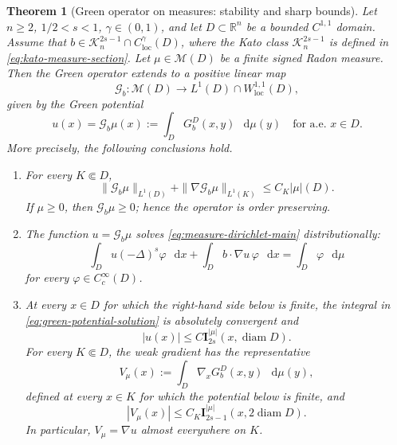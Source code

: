 \documentclass[10pt,a4paper]{amsart}
\numberwithin{equation}{section}
\newtheorem{theorem}{Theorem}[section]
\newcommand{\R}{\mathbb R}
\newcommand{\M}{\mathcal M}
\newcommand{\I}{\mathbf I}
\newcommand{\differential}{\mathop{}\!\mathrm d}
\newcommand{\rev}[1]{#1}
\begin{document}
\begin{theorem}[\rev{Green operator on measures: stability and sharp bounds}]
\label{thm:measure-potential}
Let $n\ge2$, $1/2<s<1$, $\gamma\in(0,1)$, and let
$D\subset\R^n$ be a bounded $C^{1,1}$ domain.  Assume that
$b\in\mathcal K_n^{2s-1}\cap C^\gamma_{\mathrm{loc}}(D)$, where the Kato
class $\mathcal K_n^{2s-1}$ is defined in
\eqref{eq:kato-measure-section}.  Let
$\mu\in\M(D)$ be a finite signed Radon measure.
\begingroup
\rev{Then the Green
operator extends to a positive linear map}
\[
 \mathcal G_b:\M(D)\longrightarrow
 L^1(D)\cap W^{1,1}_{\mathrm{loc}}(D),
\]
\rev{given by the Green potential}
\begin{equation}\label{eq:green-potential-solution}
 u(x)=\mathcal G_b\mu(x):=\int_DG_b^D(x,y)\,\differential\mu(y)
 \quad\text{for a.e. }x\in D.
\end{equation}
\rev{More precisely, the following conclusions hold.}
\begin{enumerate}
\item \rev{For every $K\Subset D$,}
\begin{equation}\label{eq:green-measure-operator-bound}
 \|\mathcal G_b\mu\|_{L^1(D)}
 +\|\nabla\mathcal G_b\mu\|_{L^1(K)}
 \le C_K|\mu|(D).
\end{equation}
\rev{If $\mu\ge0$, then $\mathcal G_b\mu\ge0$; hence the operator is
order preserving.}

\item \rev{The function $u=\mathcal G_b\mu$ solves
\eqref{eq:measure-dirichlet-main} distributionally:}
\begin{equation}\label{eq:measure-distributional}
 \int_D u(-\Delta)^s\varphi\,\differential x
 +\int_D b\cdot\nabla u\,\varphi\,\differential x
 =\int_D\varphi\,\differential\mu
\end{equation}
for every $\varphi\in C_c^\infty(D)$.

\item \rev{At every $x\in D$ for which the right-hand side below is
finite, the integral in \eqref{eq:green-potential-solution} is absolutely
convergent and}
\begin{equation}\label{eq:u-potential-bound}
 |u(x)|\le C\I_{2s}^{|\mu|}(x,\operatorname{diam}D).
\end{equation}
\rev{For every $K\Subset D$, the weak gradient has the representative}
\begin{equation}\label{eq:green-potential-gradient}
 V_\mu(x):=\int_D\nabla_xG_b^D(x,y)\,\differential\mu(y),
\end{equation}
\rev{defined at every $x\in K$ for which the potential below is finite,
and}
\begin{equation}\label{eq:gradient-potential-bound}
 |V_\mu(x)|\le C_K\I_{2s-1}^{|\mu|}
 (x,2\operatorname{diam}D).
\end{equation}
\rev{In particular, $V_\mu=\nabla u$ almost everywhere on $K$.}


\end{enumerate}
\end{theorem}
\end{document}
